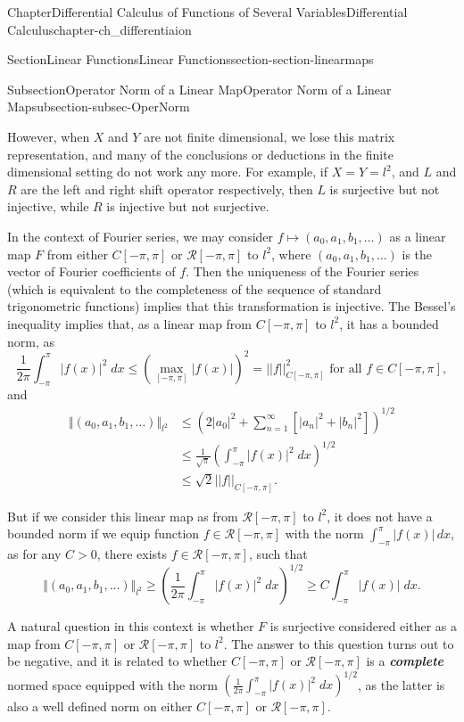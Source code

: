 \documentclass[oneside,10pt,]{book}
\newcommand{\alert}[1]{\textbf{\textit{#1}}}
\numberwithin{equation}{section}
\newcommand{\amp}{&}
\begin{document}
\begin{chapterptx}{Chapter}{Differential Calculus of Functions of Several Variables}{}{Differential Calculus}{}{}{chapter-ch_differentiaion}
\begin{sectionptx}{Section}{Linear Functions}{}{Linear Functions}{}{}{section-section-linearmaps}
\begin{subsectionptx}{Subsection}{Operator Norm of a Linear Map}{}{Operator Norm of a Linear Map}{}{}{subsection-subsec-OperNorm}
\par
However, when \(X\) and \(Y\) are not finite dimensional, we lose this matrix representation, and many of the conclusions or deductions in the finite dimensional setting do not work any more. For example, if \(X=Y=l^{2}\), and \(L\) and \(R\) are the left and right shift operator respectively, then \(L\) is surjective but not injective, while \(R\) is injective but not surjective.%
\par
In the context of Fourier series, we may consider \(f\mapsto (a_{0}, a_{1}, b_{1}, \ldots)\) as a linear map \(F\) from either \(C[-\pi, \pi]\) or \({\mathcal R}[-\pi, \pi]\) to \(l^{2}\), where \((a_{0}, a_{1}, b_{1}, \ldots)\) is the vector of Fourier coefficients of \(f\). Then the uniqueness of the Fourier series (which is equivalent	to the completeness of the sequence of standard trigonometric functions) implies that this transformation is injective. The Bessel's inequality implies that, as a linear map from \(C[-\pi, \pi]\) to \(l^{2}\), it has a bounded norm, as%
\begin{equation*}
\frac{1}{2\pi} \int_{-\pi}^{\pi}|f(x)|^{2}\;dx \le (\max_{[-\pi, \pi]}|f(x)|)^{2} =||f||_{C[-\pi, \pi]}^{2}
\text{ for all } f\in C[-\pi, \pi],
\end{equation*}
and%
\begin{align*}
\Vert (a_{0}, a_{1}, b_{1}, \ldots) \Vert_{l^2}
\amp \le \left(2|a_{0}|^{2}+ \sum_{n=1}^{\infty} \left[ |a_{n}|^{2}+|b_{n}|^{2}\right]\right)^{1/2}\\
\amp \le \frac{1}{\sqrt \pi} \left( \int_{-\pi}^{\pi}|f(x)|^{2}\;dx \right)^{1/2}\\
\amp \le \sqrt 2 ||f||_{C[-\pi, \pi]}.
\end{align*}
%
\par
But if we consider this linear map  as from \({\mathcal R}[-\pi, \pi]\) to \(l^{2}\), it does not have a bounded norm if we equip function  \(f\in 
{\mathcal R}[-\pi, \pi]\) with the norm \(\int_{-\pi}^{\pi}|f(x)|\, dx\), as for any \(C>0\),  there exists \(f\in {\mathcal R}[-\pi, \pi]\),  such that%
\begin{equation*}
\Vert (a_{0}, a_{1}, b_{1}, \ldots) \Vert_{l^2}\ge \left( \frac{1}{2\pi} \int_{-\pi}^{\pi}|f(x)|^{2}\;dx\right)^{1/2}\ge C 
\int_{-\pi}^{\pi}|f(x)|\;dx.
\end{equation*}
%
\par
A natural question in this context is whether \(F\) is surjective considered either as a map from  \(C[-\pi, \pi]\) or \({\mathcal R}[-\pi, \pi]\) to \(l^{2}\). The answer to this question turns out to be negative, and it is related to whether \(C[-\pi, \pi]\) or \({\mathcal R}[-\pi, \pi]\) is a \alert{complete} normed space equipped with the norm \(\left( \frac{1}{2\pi} \int_{-\pi}^{\pi}|f(x)|^{2}\;dx\right)^{1/2}\), as the latter is also a well defined norm on either \(C[-\pi, \pi]\) or \({\mathcal R}[-\pi, \pi]\).%

\end{subsectionptx}
\end{sectionptx}
\end{chapterptx}
\end{document}
